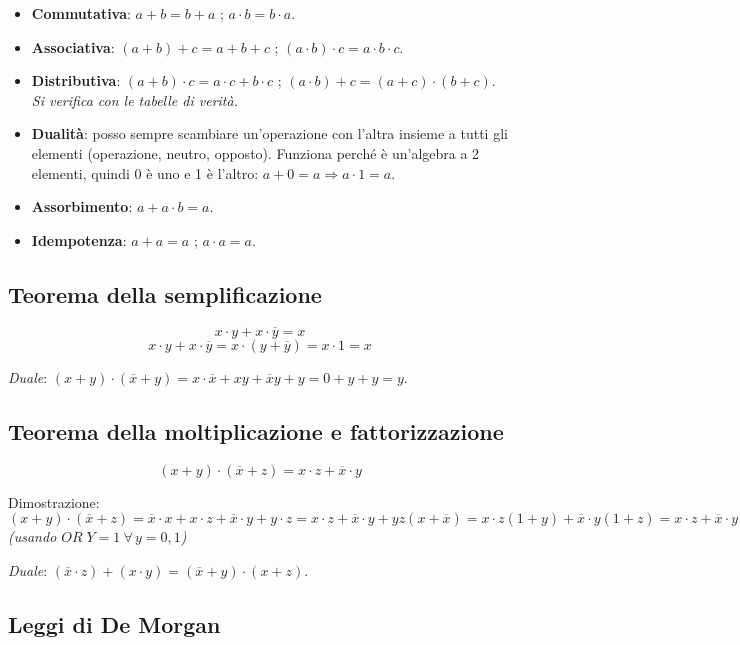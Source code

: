 \documentclass[11pt,a4paper]{report}
\begin{document}
\begin{itemize}[leftmargin=1.5em]
    \item \textbf{Commutativa}: $a+b=b+a$ \quad ; \quad $a\cdot b=b\cdot a$.
    \item \textbf{Associativa}: $(a+b)+c=a+b+c$ \quad ; \quad $(a\cdot b)\cdot c=a\cdot b\cdot c$.
    \item \textbf{Distributiva}: $(a+b)\cdot c=a\cdot c+b\cdot c$ \quad ; \quad $(a\cdot b)+c=(a+c)\cdot(b+c)$. \\
    \textit{Si verifica con le tabelle di verità.}
    \item \textbf{Dualità}: posso sempre scambiare un'operazione con l'altra insieme a tutti gli elementi (operazione, neutro, opposto). Funziona perché è un'algebra a 2 elementi, quindi 0 è uno e 1 è l'altro: $a+0=a \Rightarrow a\cdot 1=a$.
    \item \textbf{Assorbimento}: $a+a\cdot b=a$.
    \item \textbf{Idempotenza}: $a+a=a$ \quad ; \quad $a\cdot a=a$.
\end{itemize}

\subsection{Teorema della semplificazione}

\[
x\cdot y + x\cdot\overline{y} = x
\]
\[
x\cdot y + x\cdot\overline{y} = x\cdot(y+\overline{y}) = x\cdot 1 = x
\]

\noindent\textit{Duale}: $(x+y)\cdot(\overline{x}+y)=x\cdot\overline{x}+xy+\overline{x}y+y=0+y+y=y$.

\subsection{Teorema della moltiplicazione e fattorizzazione}

\[
(x+y)\cdot(\overline{x}+z)=x\cdot z+\overline{x}\cdot y
\]

Dimostrazione:
\[
(x+y)\cdot(\overline{x}+z)=\overline{x}\cdot x+x\cdot z+\overline{x}\cdot y+y\cdot z
=x\cdot z+\overline{x}\cdot y+yz(x+\overline{x})
=x\cdot z(1+y)+\overline{x}\cdot y(1+z)=x\cdot z+\overline{x}\cdot y
\]
\textit{(usando $OR\;Y=1\ \forall\,y=0,1$)}

\noindent\textit{Duale}: $(\overline{x}\cdot z)+(x\cdot y)=(\overline{x}+y)\cdot(x+z)$.

\subsection{Leggi di De Morgan}
\end{document}
